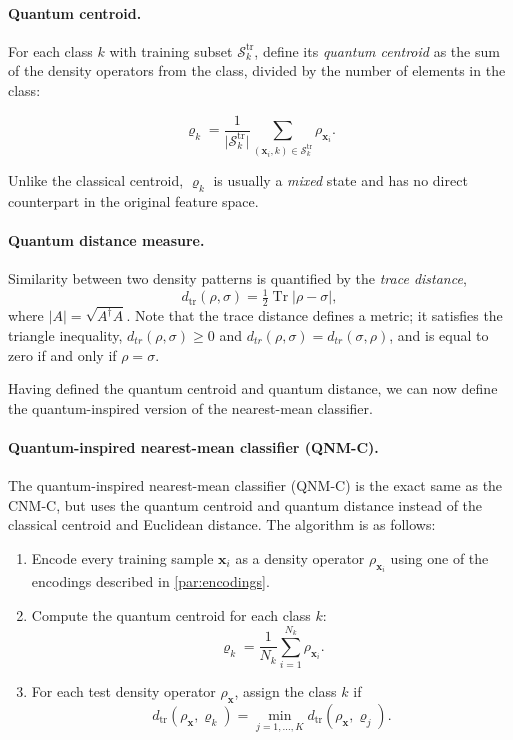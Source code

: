 \documentclass[twocolumn]{article} %
\begin{document}
\paragraph{Quantum centroid.}
For each class \(k\) with training subset
\(\mathcal S_{k}^{\mathrm{tr}}\), define its \emph{quantum centroid} as the sum of the density operators from the class, divided by the number of elements in the class:

\[
\varrho_{k}=\frac{1}{\lvert\mathcal S_{k}^{\mathrm{tr}}\rvert}
            \sum_{(\mathbf x_i,k)\in\mathcal S_{k}^{\mathrm{tr}}}
            \rho_{\mathbf x_i}.
\]

Unlike the classical centroid, \(\varrho_{k}\) is usually a
\emph{mixed} state and has no direct counterpart in the original
feature space.

\paragraph{Quantum distance measure.}
Similarity between two density patterns is quantified by the
\emph{trace distance},
\[
  d_{\operatorname{tr}}(\rho,\sigma)=
  \tfrac12\operatorname{Tr}\!\bigl|\rho-\sigma\bigr|,
\]
where \(\lvert A\rvert=\sqrt{A^{\dagger}A}\). Note that the trace distance defines a metric; it satisfies the triangle inequality, $d_{tr}(\rho, \sigma) \geq 0$ and $d_{tr}(\rho, \sigma) = d_{tr}(\sigma, \rho)$, and is equal to zero if and only if $\rho = \sigma$.

Having defined the quantum centroid and quantum distance, we can now define the quantum-inspired version of the nearest-mean classifier.

\paragraph{Quantum-inspired nearest-mean classifier (QNM-C).}
The quantum-inspired nearest-mean classifier (QNM-C) is the exact same as the CNM-C, but uses the quantum centroid and quantum distance instead of the classical centroid and Euclidean distance. The algorithm is as follows:
\begin{enumerate}[leftmargin=*,label=(\alph*)]
    \item Encode every training sample \(\mathbf x_i\) as a density operator
      \(\rho_{\mathbf x_i}\) using one of the encodings described in \ref{par:encodings}.

    \item Compute the quantum centroid for each class \(k\):
        \[
            \varrho_{k}=\frac{1}{N_k}\sum_{i=1}^{N_k}\rho_{\mathbf x_i}.
        \]

    \item For each test density operator \(\rho_{\mathbf x}\), assign the class $k$ if 
        \[
            d_{\operatorname{tr}}(\rho_{\mathbf x},\varrho_{k}) = \min_{j=1,\dots,K} d_{\operatorname{tr}}(\rho_{\mathbf x},\varrho_{j}).
        \]
\end{enumerate}
\end{document}

